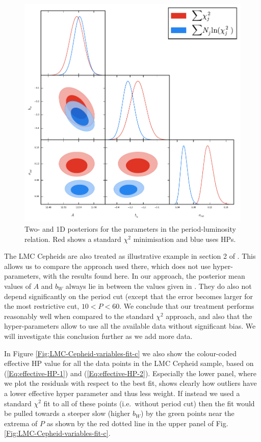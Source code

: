 \begin{figure}[hbtp]
\centering
\includegraphics[scale=1]{figures/chapter-h0/triangle_figure_joint_sigma_int.pdf}
\caption{Two- and 1D posteriors for the parameters in the period-luminosity relation. Red shows a standard $\chi^2$ minimisation and blue uses HPs.  }
\label{fig:sigmaint}
\end{figure}

The LMC Cepheids are also treated as illustrative example in section 2 of \cite{Efstathiou:2013via}. This allows us to compare the approach used there, which does not use hyper-parameters, with the results found here. In our approach, the posterior mean values of $A$ and $b_W$ always lie in between the values given in \cite{Efstathiou:2013via}. They do also not depend significantly on the period cut (except that the error becomes larger for the most restrictive cut, $10<P<60$. We conclude that our treatment performs reasonably well when compared to the standard $\chi^2$ approach, and also that the hyper-parameters allow to use all the available data without significant bias. We will investigate this conclusion further as we add more data.

In Figure \ref{Fig:LMC-Cepheid-variables-fit-c} we also show the colour-coded effective HP value for all the data points in the LMC Cepheid sample, based on (\ref{Eq:effective-HP-1}) and (\ref{Eq:effective-HP-2}). Especially the lower panel, where we plot the residuals with respect to the best fit, shows clearly how outliers have a lower effective hyper parameter and thus less weight. If instead we used a standard $\chi^2$ fit to all of these points (i.e.\ without period cut) then the fit would be pulled towards a steeper slow (higher $b_W$) by the green points near the extrema of $P$ as shown by the red dotted line in the upper panel of Fig. \ref{Fig:LMC-Cepheid-variables-fit-c}. 

